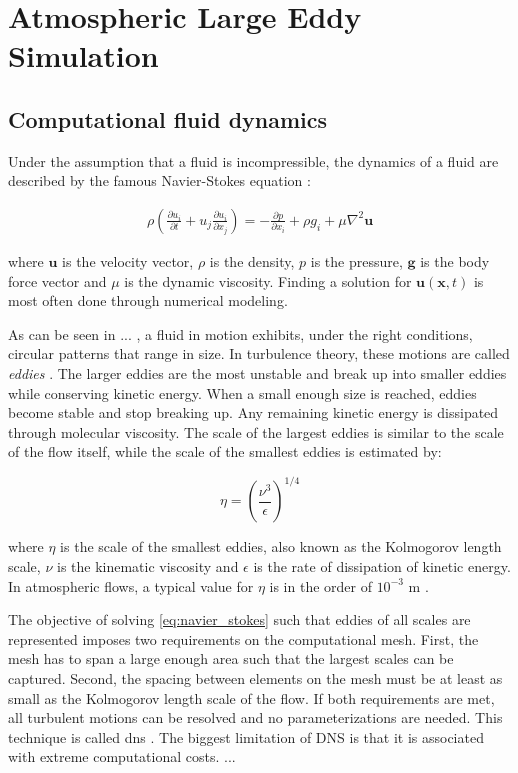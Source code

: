 \chapter{Atmospheric Large Eddy Simulation}

\section{Computational fluid dynamics}
Under the assumption that a fluid is incompressible, the dynamics of a fluid are described by the famous Navier-Stokes equation :

    \begin{align}
        \rho \left( \frac{\partial u_i}{\partial t} + u_j \frac{\partial u_i}{\partial x_j} \right) = - \frac{\partial p}{\partial x_i} + \rho g_i + \mu \nabla^2 \mathbf{u}
        \label{eq:navier_stokes}
    \end{align}

\noindent where $\mathbf{u}$ is the velocity vector, $\rho$ is the density, $p$ is the pressure, $\mathbf{g}$ is the body force vector and $\mu$ is the dynamic viscosity. Finding a solution for $\mathbf{u}(\mathbf{x},t)$ is most often done through numerical modeling. 

As can be seen in ... , a fluid in motion exhibits, under the right conditions, circular patterns that range in size. In turbulence theory, these motions are called \emph{eddies} \citep{popeTurbulentFlows2000}. The larger eddies are the most unstable and break up into smaller eddies while conserving kinetic energy. When a small enough size is reached, eddies become stable and stop breaking up. Any remaining kinetic energy is dissipated through molecular viscosity. The scale of the largest eddies is similar to the scale of the flow itself, while the scale of the smallest eddies is estimated by:

\begin{equation}
    \eta = \left( \frac{\nu^3}{\epsilon} \right)^{1/4}
    \label{eq:kolmogorov-length}
\end{equation}

where $\eta$ is the scale of the smallest eddies, also known as the Kolmogorov length scale, $\nu$ is the kinematic viscosity and $\epsilon$ is the rate of dissipation of kinetic energy. In atmospheric flows, a typical value for $\eta$ is in the order of $10^{-3}$ m . 

The objective of solving \autoref{eq:navier_stokes} such that eddies of all scales are represented imposes two requirements on the computational mesh. First, the mesh has to span a large enough area such that the largest scales can be captured. Second, the spacing between elements on the mesh must be at least as small as the Kolmogorov length scale of the flow. If both requirements are met, all turbulent motions can be resolved and no parameterizations are needed. This technique is called \acrfull{dns} \citep{popeTurbulentFlows2000}. The biggest limitation of DNS is that it is associated with extreme computational costs. ...

